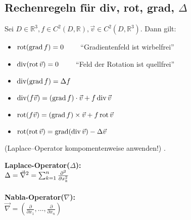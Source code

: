 \subsection{Rechenregeln für div, rot, grad, $\Delta$}
\begin{minipage}{9cm}
Sei $D \in \mathbb{R}^3, f \in C^2(D,\mathbb{R}), \vec{v} \in C^2(D,\mathbb{R}^3)$. Dann gilt:
\begin{itemize}
	\item $\operatorname{rot}(\operatorname{grad} f) = 0 \qquad $ ``Gradientenfeld ist wirbelfrei''
	\item $\operatorname{div}(\operatorname{rot} \vec{v}) = 0 \qquad $ ``Feld der Rotation ist quellfrei''
	\item $\operatorname{div}(\operatorname{grad} f) = \Delta f$
	\item $\operatorname{div}(f\vec{v}) = (\operatorname{grad} f) \cdot \vec{v} + f \operatorname{div} \vec{v}$
	\item $\operatorname{rot}(f\vec{v}) = (\operatorname{grad} f) \times \vec{v} + f \operatorname{rot} \vec{v}$
	\item $\operatorname{rot}(\operatorname{rot} \vec{v}) = \operatorname{grad}(\operatorname{div} \vec{v}) - \Delta \vec{v}$
\end{itemize}
(Laplace–Operator kompomentenweise anwenden!) .
\end{minipage}
\hspace{1cm}
\begin{minipage}[b]{6cm}
\textbf{Laplace-Operator($\Delta$):}\\
$\Delta=\vec\nabla^2= \sum_{k=1}^n {\partial^2\over \partial x_k^2}$\\\\
\textbf{ Nabla-Operator($\nabla$):}\\
$\vec\nabla = \left (\frac\partial{\partial x_1},\ldots, \frac\partial{\partial
x_n}\right) $
\end{minipage}
\newpage
%

\newpage



